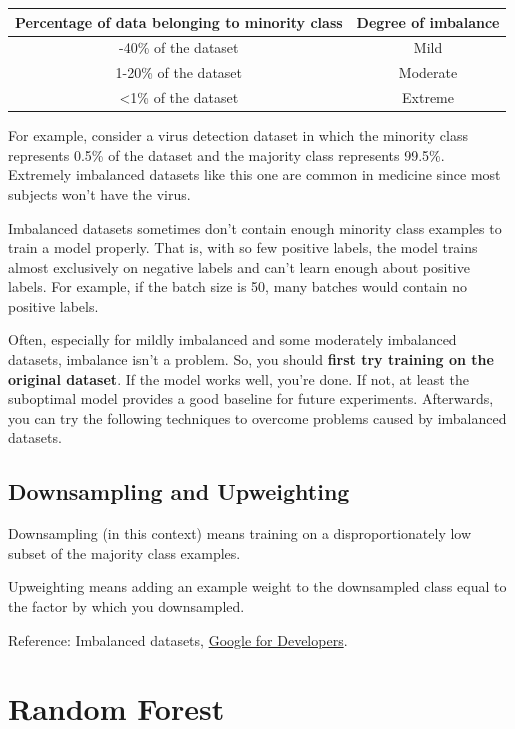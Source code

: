 \documentclass[
  a4paper,
  twoside,
  openright]{book}
\theoremstyle{definition}
\theoremstyle{definition}
\theoremstyle{definition}
\theoremstyle{definition}
\theoremstyle{remark}
\begin{document}
\begin{longtable}[]{@{}cc@{}}
\toprule\noalign{}
Percentage of data belonging to minority class & Degree of imbalance \\
\midrule\noalign{}
\endhead
\bottomrule\noalign{}
\endlastfoot
20-40\% of the dataset & Mild \\
1-20\% of the dataset & Moderate \\
\textless1\% of the dataset & Extreme \\
\end{longtable}

For example, consider a virus detection dataset in which the minority class represents 0.5\% of the dataset and the majority class represents 99.5\%. Extremely imbalanced datasets like this one are common in medicine since most subjects won't have the virus.

Imbalanced datasets sometimes don't contain enough minority class examples to train a model properly. That is, with so few positive labels, the model trains almost exclusively on negative labels and can't learn enough about positive labels. For example, if the batch size is 50, many batches would contain no positive labels.

Often, especially for mildly imbalanced and some moderately imbalanced datasets, imbalance isn't a problem. So, you should \textbf{first try training on the original dataset}. If the model works well, you're done. If not, at least the suboptimal model provides a good baseline for future experiments. Afterwards, you can try the following techniques to overcome problems caused by imbalanced datasets.

\subsection{Downsampling and Upweighting}\label{downsampling-and-upweighting}

Downsampling (in this context) means training on a disproportionately low subset of the majority class examples.

Upweighting means adding an example weight to the downsampled class equal to the factor by which you downsampled.

Reference: Imbalanced datasets, \href{https://developers.google.com/machine-learning/crash-course/overfitting/imbalanced-datasets}{Google for Developers}.

\section{Random Forest}\label{random-forest}
\end{document}
